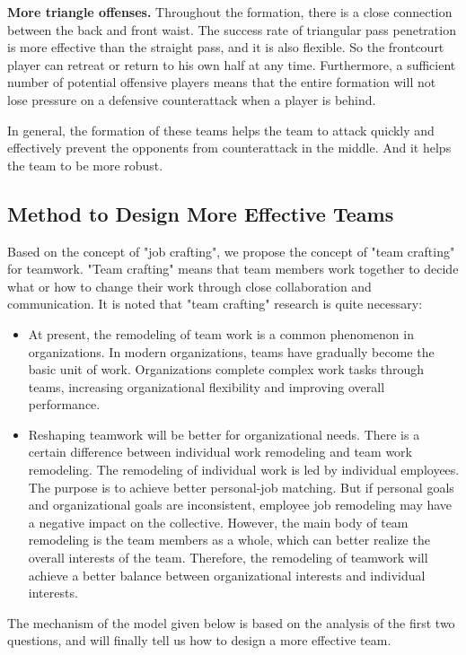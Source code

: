\documentclass{mcmthesis}
\begin{document}
\textbf{More triangle offenses.} Throughout the formation, there is a close connection between the back and front waist. The success rate of triangular pass penetration is more effective than the straight pass, and it is also flexible. So the frontcourt player can retreat or return to his own half at any time. Furthermore, a sufficient number of potential offensive players means that the entire formation will not lose pressure on a defensive counterattack when a player is behind.
\par
In general, the formation of these teams helps the team to attack quickly and effectively prevent the opponents from counterattack in the middle. And it helps the team to be more robust.

\subsection{Method to Design More Effective Teams}
	Based on the concept of "job crafting", we propose the concept of "team crafting" for teamwork.  "Team crafting" means that team members work together to decide what or how to change their work through close collaboration and communication.  It is noted that "team crafting" research is quite necessary:
	\begin{itemize}
		\item At present, the remodeling of team work is a common phenomenon in organizations. In modern organizations, teams have gradually become the basic unit of work.  Organizations complete complex work tasks through teams, increasing organizational flexibility and improving overall performance.
		\item Reshaping teamwork will be better for organizational needs.  There is a certain difference between individual work remodeling and team work remodeling. The remodeling of individual work is led by individual employees. The purpose is to achieve better personal-job matching.  But if personal goals and organizational goals are inconsistent, employee job remodeling may have a negative impact on the collective. However, the main body of team remodeling is the team members as a whole, which can better realize the overall interests of the team.  Therefore, the remodeling of teamwork will achieve a better balance between organizational interests and individual interests.
	\end{itemize}

	The mechanism of the model given below is based on the analysis of the first two questions, and will finally tell us how to design a more effective team.
\end{document}
